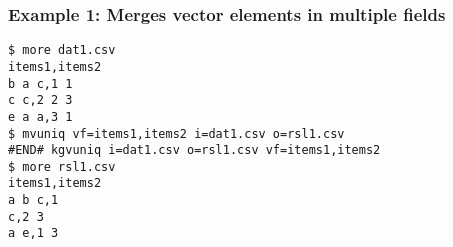 \subsubsection*{Example 1: Merges vector elements in multiple fields}



\begin{Verbatim}[baselinestretch=0.7,frame=single]
$ more dat1.csv
items1,items2
b a c,1 1
c c,2 2 3
e a a,3 1
$ mvuniq vf=items1,items2 i=dat1.csv o=rsl1.csv
#END# kgvuniq i=dat1.csv o=rsl1.csv vf=items1,items2
$ more rsl1.csv
items1,items2
a b c,1
c,2 3
a e,1 3
\end{Verbatim}
